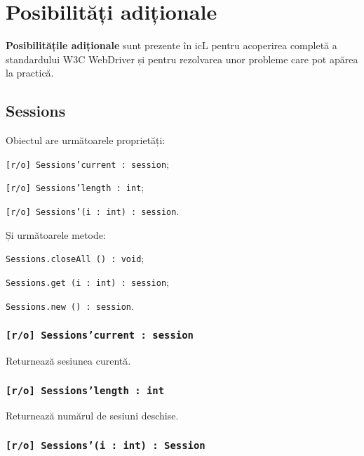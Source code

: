 

\section{Posibilități adiționale}

{\bf Posibilitățile adiționale} sunt prezente în icL pentru acoperirea completă a standardului W3C WebDriver și pentru rezolvarea unor probleme care pot apărea la practică.

\subsection{{\color{orange} Sessions}}

Obiectul \sessions{} are următoarele proprietăți:
\begin{icItems}
	\item \texttt{[r/o] Sessions'current : session};
	\item \texttt{[r/o] Sessions'length : int};
	\item \texttt{[r/o] Sessions'(i : int) : session}.
\end{icItems}

Și următoarele metode:
\begin{icItems}
	\item \texttt{Sessions.closeAll () : void};
	\item \texttt{Sessions.get (i : int) : session};
	\item \texttt{Sessions.new () : session}.
\end{icItems}

\subsubsection{\texttt{[r/o] Sessions'current : session}}

Returnează sesiunea curentă.

\subsubsection{\texttt{[r/o] Sessions'length : int}}

Returnează numărul de sesiuni deschise.

\subsubsection{\texttt{[r/o] Sessions'(i : int) : Session}}

